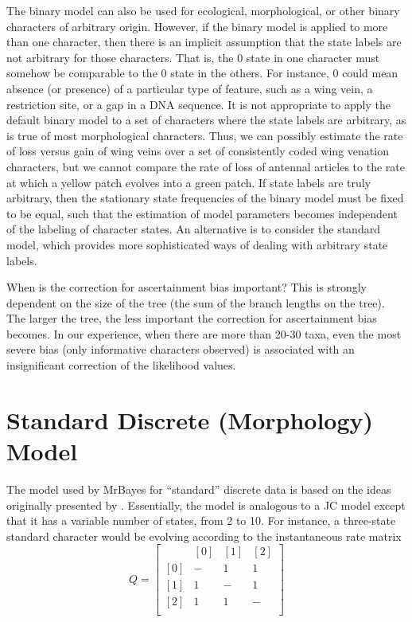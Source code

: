 \documentclass[12pt]{book}
\begin{document}
The binary model can also be used for ecological, morphological, or other binary characters of
arbitrary origin. However, if the binary model is applied to more than one character, then there is
an implicit assumption that the state labels are not arbitrary for those characters. That is, the 0
state in one character must somehow be comparable to the 0 state in the others. For instance, 0
could mean absence (or presence) of a particular type of feature, such as a wing vein, a
restriction site, or a gap in a DNA sequence. It is not appropriate to apply the default binary
model to a set of characters where the state labels are arbitrary, as is true of most morphological
characters. Thus, we can possibly estimate the rate of loss versus gain of wing veins over a set of
consistently coded wing venation characters, but we cannot compare the rate of loss of antennal
articles to the rate at which a yellow patch evolves into a green patch. If state labels are truly
arbitrary, then the stationary state frequencies of the binary model must be fixed to be equal,
such that the estimation of model parameters becomes independent of the labeling of character
states. An alternative is to consider the standard model, which provides more sophisticated ways
of dealing with arbitrary state labels.

When is the correction for ascertainment bias important? This is strongly dependent on the size of
the tree (the sum of the branch lengths on the tree). The larger the tree, the less important the
correction for ascertainment bias becomes. In our experience, when there are more than 20-30 taxa,
even the most severe bias (only informative characters observed) is associated with an
insignificant correction of the likelihood values.

\section{Standard Discrete (Morphology) Model}
The model used by MrBayes for ``standard'' discrete data is based on the ideas originally presented
by \citet{lewis01}. Essentially, the model is analogous to a JC model except that it has a variable
number of states, from 2 to 10. For instance, a three-state standard character would be evolving
according to the instantaneous rate matrix
\[
Q=\begin{bmatrix}
    & [0] & [1] & [2]\\
 [0]& - & 1 & 1\\
 [1]& 1& -  & 1\\
 [2]& 1& 1  & -\\
\end{bmatrix}
\]
\end{document}
